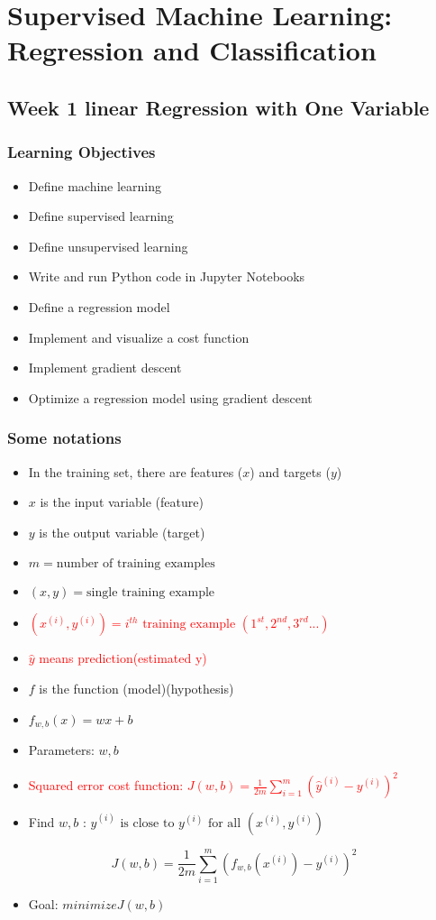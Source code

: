\documentclass{article}
\begin{document}
    \tableofcontents
    \newpage
    \section{Supervised Machine Learning: Regression and Classification}
    \subsection{Week 1 linear Regression with One Variable}
	\subsubsection{Learning Objectives}
    \begin{itemize}
	    \item Define machine learning
        \item Define supervised learning
        \item Define unsupervised learning
        \item Write and run Python code in Jupyter Notebooks
        \item Define a regression model
        \item Implement and visualize a cost function
        \item Implement gradient descent
        \item Optimize a regression model using gradient descent
    \end{itemize}  
    \subsubsection*{Some notations}
    \begin{itemize}
	    \item In the training set, there are features ($x$) and targets ($y$)
        \item $x$ is the input variable (feature)
        \item $y$ is the output variable (target)
        \item $m = \text{number of training examples}$
        \item $(x,y) = \text{single training example}$
        \item \textcolor{red}{$(x^{(i)},y^{(i)}) = i^{th}\text{ training example } (1^{st},2^{nd},3^{rd}...)$ }
        \item \textcolor{red}{$\hat{y}$ means prediction(estimated y)}
        \item $f$ is the function (model)(hypothesis)
        \item $f_{w,b}(x)=wx+b$
        \item Parameters: $w,b$
        \item \textcolor{red}{Squared error cost function: $J(w,b)=\frac{1}{2m}\sum_{i=1}^{m}(\hat{y}^{(i)}-y^{(i)})^2$}
        \item Find $w,b$ : $\hat{y}^{(i)}\text{ is close to }y^{(i)}\text{ for all }(x^{(i)},y^{(i)})$
    \end{itemize} 
    \[ J(w,b)=\frac{1}{2m}\sum_{i=1}^{m}(f_{w,b}(x^{(i)})-y^{(i)})^2 \]
    \begin{itemize}
        \item Goal: $minimizeJ(w,b)$
    \end{itemize}
\end{document}
